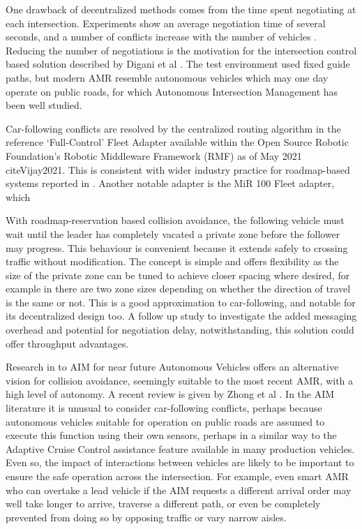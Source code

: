 \documentclass[runningheads]{llncs}
\begin{document}
One drawback of decentralized methods comes from the time spent negotiating at each intersection. Experiments show an average negotiation time of several seconds, and a number of conflicts increase with the number of vehicles \cite{Draganjac2020}. Reducing the number of negotiations is the motivation for the intersection control based solution described by Digani et al \cite{Digani2019}. The test environment used fixed guide paths, but modern AMR resemble autonomous vehicles which may one day operate on public roads, for which Autonomous Intersection Management has been well studied. 

Car-following conflicts are resolved by the centralized routing algorithm in the reference `Full-Control' Fleet Adapter available within the Open Source Robotic Foundation's Robotic Middleware Framework (RMF) as of May 2021 cite{Vijay2021}. This is consistent with wider industry practice for roadmap-based systems reported in \cite{Fragapane2021}. Another notable adapter is the MiR 100 Fleet adapter, which 

With roadmap-reservation based collision avoidance, the following vehicle must wait until the leader has completely vacated a private zone before the follower may progress. This behaviour is convenient because it extends safely to crossing traffic without modification. The concept is simple and offers flexibility as the size of the private zone can be tuned to achieve closer spacing where desired, for example in \cite{Walenta2017} there are two zone sizes depending on whether the direction of travel is the same or not. This is a good approximation to car-following, and notable for its decentralized design too. A follow up study to investigate the added messaging overhead and potential for negotiation delay, notwithstanding, this solution could offer throughput advantages.

Research in to AIM for near future Autonomous Vehicles offers an alternative vision for collision avoidance, seemingly suitable to the most recent AMR, with a high level of autonomy. A recent review is given by Zhong et al \cite{Zhong2020}. In the AIM literature it is unusual to consider car-following conflicts, perhaps because autonomous vehicles suitable for operation on public roads are assumed to execute this function using their own sensors, perhaps in a similar way to the Adaptive Cruise Control assistance feature available in many production vehicles. Even so, the impact of interactions between vehicles are likely to be important to ensure the safe operation across the intersection. For example, even smart AMR who can overtake a lead vehicle if the AIM requests a different arrival order may well take longer to arrive, traverse a different path, or even be completely prevented from doing so by opposing traffic or vary narrow aisles. 
\end{document}
